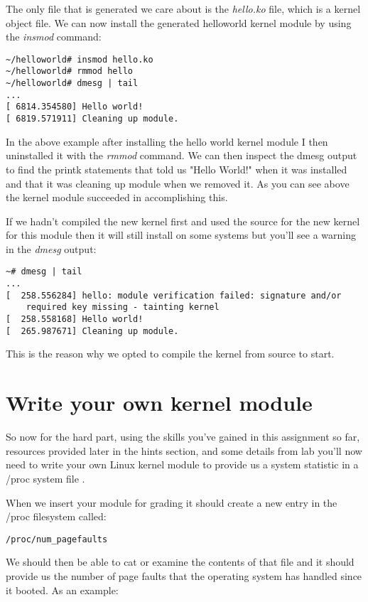 \documentclass[11pt]{article}
\begin{document}
The only file that is generated we care about is the {\it hello.ko} file, which is a kernel object file. We can now install the generated helloworld kernel module by using the {\it insmod} command:

\begin{verbatim}
~/helloworld# insmod hello.ko
~/helloworld# rmmod hello
~/helloworld# dmesg | tail
...
[ 6814.354580] Hello world!
[ 6819.571911] Cleaning up module.
\end{verbatim}

In the above example after installing the hello world kernel module I then uninstalled it with the {\it rmmod} command. We can then inspect the dmesg output to find the printk statements that told us "Hello World!" when it was installed and that it was cleaning up module when we removed it. As you can see above the kernel module succeeded in accomplishing this.

If we hadn't compiled the new kernel first and used the source for the new kernel for this module then it will still install on some systems but you'll see a warning in the {\it dmesg} output:

\begin{verbatim}
~# dmesg | tail
...
[  258.556284] hello: module verification failed: signature and/or  
	required key missing - tainting kernel
[  258.558168] Hello world!
[  265.987671] Cleaning up module.
\end{verbatim}

This is the reason why we opted to compile the kernel from source to start. 

\section*{Write your own kernel module}

So now for the hard part, using the skills you've gained in this assignment so far, resources provided later in the hints section, and some details from lab you'll now need to write your own Linux kernel module to provide us a system statistic in a /proc system file \cite{cse551}. 

When we insert your module for grading it should create a new entry in the /proc filesystem called:

\begin{verbatim}
/proc/num_pagefaults
\end{verbatim}

\newpage

We should then be able to cat or examine the contents of that file and it should provide us the number of page faults that the operating system has handled since it booted. As an example:
\end{document}
